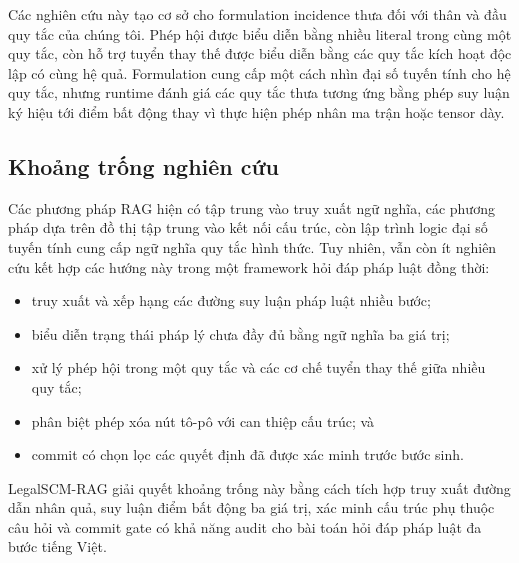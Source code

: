 Các nghiên cứu này tạo cơ sở cho formulation incidence thưa đối với thân và đầu
quy tắc của chúng tôi. Phép hội được biểu diễn bằng nhiều literal trong cùng
một quy tắc, còn hỗ trợ tuyển thay thế được biểu diễn bằng các quy tắc kích hoạt
độc lập có cùng hệ quả. Formulation cung cấp một cách nhìn đại số tuyến tính cho
hệ quy tắc, nhưng runtime đánh giá các quy tắc thưa tương ứng bằng phép suy luận
ký hiệu tới điểm bất động thay vì thực hiện phép nhân ma trận hoặc tensor dày.

\subsection{Khoảng trống nghiên cứu}

Các phương pháp RAG hiện có tập trung vào truy xuất ngữ nghĩa, các phương pháp
dựa trên đồ thị tập trung vào kết nối cấu trúc, còn lập trình logic đại số tuyến
tính cung cấp ngữ nghĩa quy tắc hình thức. Tuy nhiên, vẫn còn ít nghiên cứu kết
hợp các hướng này trong một framework hỏi đáp pháp luật đồng thời:

\begin{itemize}
    \item truy xuất và xếp hạng các đường suy luận pháp luật nhiều bước;
    \item biểu diễn trạng thái pháp lý chưa đầy đủ bằng ngữ nghĩa ba giá trị;
    \item xử lý phép hội trong một quy tắc và các cơ chế tuyển thay thế giữa
    nhiều quy tắc;
    \item phân biệt phép xóa nút tô-pô với can thiệp cấu trúc; và
    \item commit có chọn lọc các quyết định đã được xác minh trước bước sinh.
\end{itemize}

LegalSCM-RAG giải quyết khoảng trống này bằng cách tích hợp truy xuất đường dẫn
nhân quả, suy luận điểm bất động ba giá trị, xác minh cấu trúc phụ thuộc câu hỏi
và commit gate có khả năng audit cho bài toán hỏi đáp pháp luật đa bước tiếng
Việt.

